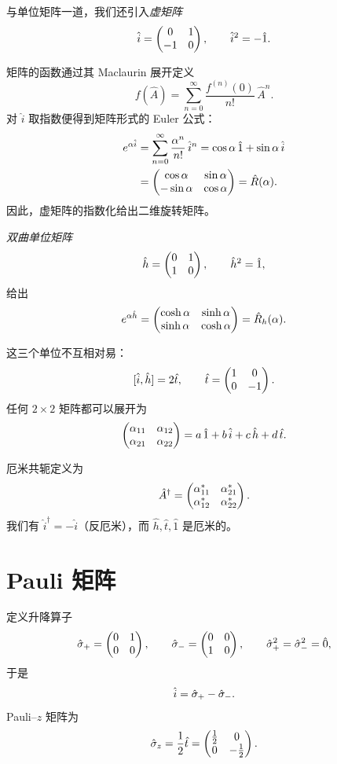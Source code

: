 与单位矩阵一道，我们还引入\emph{虚矩阵}
\begin{equation}
\hat{i} = \begin{pmatrix}0 & 1 \\ -1 & 0\end{pmatrix},\qquad \hat{i}^{2} = -\hat{1}.
\label{eq:1.1.9}
\end{equation}

矩阵的函数通过其 Maclaurin 展开定义
\[
f(\hat{A}) = \sum_{n=0}^{\infty}\frac{f^{(n)}(0)}{n!}\,\hat{A}^{n}.
\]
对 $\hat{i}$ 取指数便得到矩阵形式的 Euler 公式：
\begin{align}
e^{\alpha\hat{i}}
&= \sum_{n=0}^{\infty}\frac{\alpha^{n}}{n!}\,\hat{i}^{n}
 = \cos\alpha\,\hat{1} + \sin\alpha\,\hat{i} \notag \\
&= \begin{pmatrix}\cos\alpha & \sin\alpha \\ -\sin\alpha & \cos\alpha\end{pmatrix}
 = \hat{R}(\alpha).
\label{eq:1.1.17}
\end{align}
因此，虚矩阵的指数化给出二维旋转矩阵。

\emph{双曲单位矩阵}
\[
\hat{h} = \begin{pmatrix}0 & 1 \\ 1 & 0\end{pmatrix},\qquad \hat{h}^{2} = \hat{1},
\]
给出
\[
e^{\alpha\hat{h}} = \begin{pmatrix}\cosh\alpha & \sinh\alpha \\ \sinh\alpha & \cosh\alpha\end{pmatrix}
= \hat{R}_{h}(\alpha).
\]

这三个单位不互相对易：
\[
[\hat{i},\hat{h}] = 2\hat{t},\qquad
\hat{t} = \begin{pmatrix}1 & 0 \\ 0 & -1\end{pmatrix}.
\]
任何 $2\times 2$ 矩阵都可以展开为
\[
\begin{pmatrix}\alpha_{11} & \alpha_{12} \\ \alpha_{21} & \alpha_{22}\end{pmatrix}
= a\,\hat{1} + b\,\hat{i} + c\,\hat{h} + d\,\hat{t}.
\]

厄米共轭定义为
\[
\hat{A}^{\dagger} = \begin{pmatrix}\alpha_{11}^{*} & \alpha_{21}^{*} \\ \alpha_{12}^{*} & \alpha_{22}^{*}\end{pmatrix}.
\]
我们有 $\hat{i}^{\dagger} = -\hat{i}$（反厄米），而 $\hat{h},\hat{t},\hat{1}$ 是厄米的。

\section{Pauli 矩阵}
\label{sec:1.2}

定义升降算子
\[
\hat{\sigma}_{+} = \begin{pmatrix}0 & 1 \\ 0 & 0\end{pmatrix},\qquad
\hat{\sigma}_{-} = \begin{pmatrix}0 & 0 \\ 1 & 0\end{pmatrix},\qquad
\hat{\sigma}_{+}^{2} = \hat{\sigma}_{-}^{2} = \hat{0},
\]
于是
\[
\hat{i} = \hat{\sigma}_{+} - \hat{\sigma}_{-}.
\]
Pauli--$z$ 矩阵为
\[
\hat{\sigma}_{z} = \frac{1}{2}\hat{t} = \begin{pmatrix}\tfrac{1}{2} & 0 \\ 0 & -\tfrac{1}{2}\end{pmatrix}.
\]

